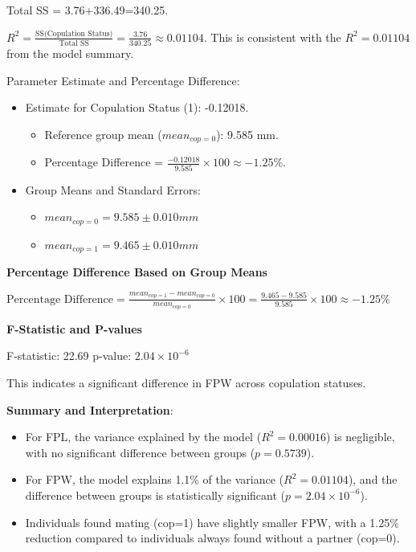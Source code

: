 \documentclass[
]{article}
\providecommand{\tightlist}{%
  \setlength{\itemsep}{0pt}\setlength{\parskip}{0pt}}
\begin{document}
Total SS = 3.76+336.49=340.25.

\(R^2 = \frac{\text{SS(Copulation Status)}}{\text{Total SS}} = \frac{3.76}{340.25} \approx 0.01104\).
This is consistent with the \(R^2 = 0.01104\) from the model summary.

Parameter Estimate and Percentage Difference:

\begin{itemize}
\item
  Estimate for Copulation Status (1): -0.12018.

  \begin{itemize}
  \tightlist
  \item
    Reference group mean (\(mean_{cop=0}\)): 9.585 mm.
  \item
    Percentage Difference =
    \(\frac{-0.12018}{9.585} \times 100 \approx -1.25 \%\).
  \end{itemize}
\item
  Group Means and Standard Errors:

  \begin{itemize}
  \tightlist
  \item
    \(mean_{cop=0} = 9.585 \pm 0.010mm\)
  \item
    \(mean_{cop=1} = 9.465 \pm 0.010mm\)
  \end{itemize}
\end{itemize}

\textbf{Percentage Difference Based on Group Means}

\(\text{Percentage Difference} = \frac{mean_{cop=1}-mean_{cop=0}}{mean_{cop=0}}\times100 = \frac{9.465-9.585}{9.585}\times100 \approx -1.25 \%\)

\textbf{F-Statistic and P-values}

F-statistic: 22.69 p-value: \(2.04 \times 10^{-6}\)

This indicates a significant difference in FPW across copulation
statuses.

\textbf{Summary and Interpretation}:

\begin{itemize}
\tightlist
\item
  For FPL, the variance explained by the model (\(R^2 = 0.00016\)) is
  negligible, with no significant difference between groups
  (\(p=0.5739\)).
\item
  For FPW, the model explains 1.1\% of the variance (\(R^2 = 0.01104\)),
  and the difference between groups is statistically significant
  (\(p = 2.04 \times 10^{-6}\)).
\item
  Individuals found mating (cop=1) have slightly smaller FPW, with a
  1.25\% reduction compared to individuals always found without a
  partner (cop=0).
\end{itemize}
\end{document}
